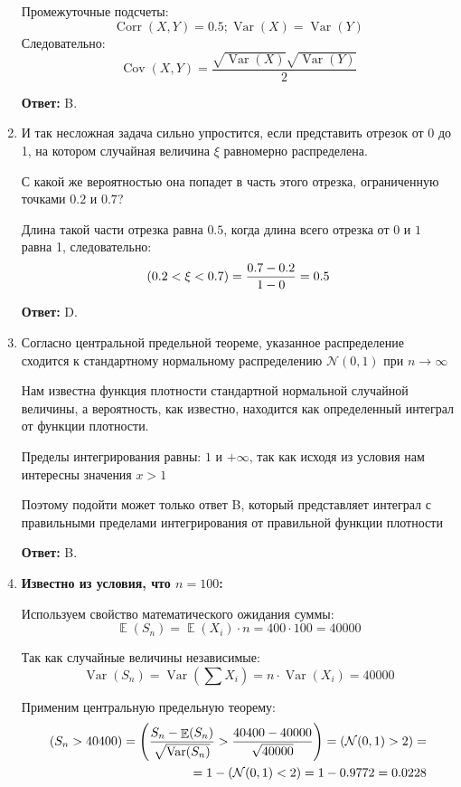 \documentclass[a4paper]{article} %
\DeclareMathOperator{\Var}{Var}
\DeclareMathOperator{\Cov}{Cov}
\DeclareMathOperator{\Corr}{Corr}
\DeclareMathOperator{\E}{\mathbb{E}}
\let\P\relax
\DeclareMathOperator{\P}{\mathbb{P}}
\newcommand{\cN}{\mathcal{N}}
\begin{document}
\begin{enumerate}
    
    Промежуточные подсчеты: 
    \[
    \Corr(X,Y) = 0.5; \Var(X) = \Var(Y) \]
    Следовательно:
    \[
    \Cov(X,Y) = \frac{\sqrt{\Var(X)}\sqrt{\Var(Y)}}{2}
    \]
    
    \textbf{Ответ:} B.
    
    
    \item
    И так несложная задача сильно упростится, если представить отрезок от 0 до 1, на котором случайная величина $\xi$ равномерно распределена. 
    
    С какой же вероятностью она попадет в часть этого отрезка, ограниченную точками $0.2$ и $0.7$?
    
    Длина такой части отрезка равна $0.5$, когда длина всего отрезка от $0$ и $1$ равна 1, следовательно:
    \[
    \P(0.2 < \xi < 0.7) = \frac{0.7 - 0.2}{1 - 0} = 0.5
    \]
    
    \textbf{Ответ:} D.
    
    
    \item
    Согласно центральной предельной теореме, указанное распределение сходится к стандартному нормальному распределению $\cN(0,1)$ при $n \rightarrow \infty$
    
    Нам известна функция плотности стандартной нормальной случайной величины, а вероятность, как известно, находится как определенный интеграл от функции плотности. 
    
    Пределы интегрирования равны: $1$ и ${+\infty}$, так как исходя из условия нам интересны значения $x > 1$
    
    Поэтому подойти может только ответ B, который представляет интеграл с правильными пределами интегрирования от правильной функции плотности
    
    \textbf{Ответ:} B.
    
    
    \item
    \textbf{Известно из условия, что $n = 100$:}
    
    Используем свойство математического ожидания суммы:
    \[
    \E(S_n) = \E(X_i) \cdot n = 400 \cdot 100 = 40000
    \]
    
    Так как случайные величины независимые:
    \[
    \Var(S_n) = \Var\left(\sum X_i\right) = n \cdot \Var(X_i) = 40000
    \]
    
    
    
    Применим центральную предельную теорему:
    \begin{align*}
    \P(S_n > 40400) = \P\left(\frac{S_n - \E(S_n)}{\sqrt{\Var(S_n)}} > \frac{40400 - 40000}{\sqrt{40000}}\right) = \P(\cN(0,1) > 2)= \\
    = 1 -\P(\cN(0,1) < 2) = 1 - 0.9772 = 0.0228
    \end{align*}


\end{enumerate}
\end{document}

